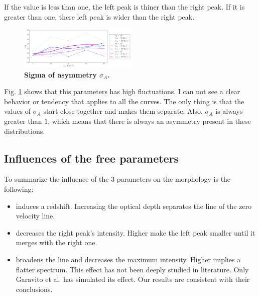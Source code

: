 \documentclass[twocolappendix]{latex/emulateapj}
\begin{document}
If the value is less than one, the left peak is thiner than the right peak. If it is greater than one, there left peak is wider than the right peak.\\

\begin{figure}[h!]
	\begin{center}
		\includegraphics[width=0.5\textwidth]{./figures/sigma}
	\end{center}
	\caption{\textbf{Sigma of asymmetry $\sigma_A$.} 
		\label{fig:sigma}}
\end{figure}

Fig. \ref{fig:sigma} shows that this parameters has high fluctuations. I can not see a clear behavior or tendency that applies to all the curves. The only thing is that the values of $\sigma_A$ start close together and \vout makes them separate. Also, $\sigma_A$ is always greater than $1$, which means that there is always an asymmetry present in these distributions.\\ 

\subsection{Influences of the free parameters}

To summarize the influence of the 3 parameters on the \lya morphology is the following: 

\begin{itemize}
	\item \tauh induces a redshift. Increasing the optical depth separates the line of the zero velocity line. \\
	\item \vout decreases the right peak's intensity. Higher \vout make the left peak smaller until it merges with the right one. \\
	\item \vrot broadens the line and decreases the maximum intensity. Higher \vrot implies a flatter spectrum. This effect has not been deeply studied in literature. Only Garavito et al. \cite{Garavito14} has simulated its effect. Our results are consistent with their conclusions. 
\end{itemize}
\end{document}
